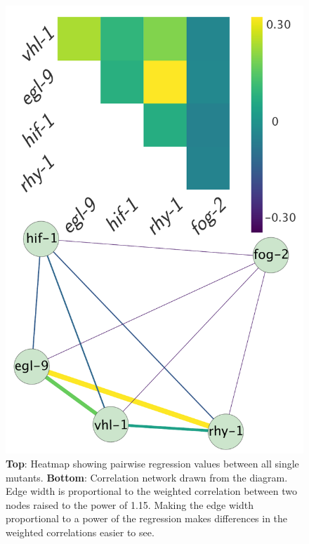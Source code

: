\documentclass[9pt,twocolumn,twoside]{pnas-new}
\begin{document}
\begin{figure}[tbhp]
\centering
\includegraphics[width=\linewidth]{figs/bayesian_heat_map.pdf}
\caption{\textbf{Top}: Heatmap showing pairwise regression values between all single mutants. \textbf{Bottom}: Correlation network drawn from the diagram. Edge width is proportional to the weighted correlation between two nodes raised to the power of 1.15. %
Making the edge width proportional to a power of the regression makes differences in the weighted correlations easier to see.}
\label{fig:heatmap}
\end{figure}
\end{document}
